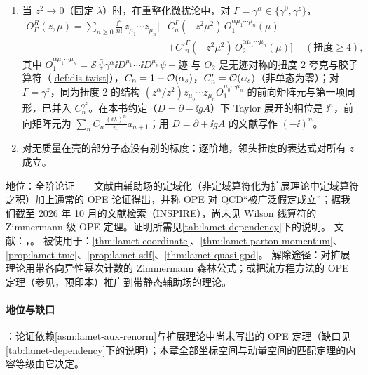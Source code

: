\begin{assumption}\label{asm:lamet-ope}
\begin{enumerate}[label=(OP\arabic*),leftmargin=3.2em,itemsep=1pt,topsep=2pt]
\item 当 $z^2\to0$（固定 $\lambda$）时，在重整化微扰论中，对 $\Gamma=\gamma^\alpha\in\{\gamma^0,\gamma^z\}$，
\begin{equation}\label{eq:lamet-ope}
\begin{split}
O^R_{\Gamma}(z,\mu)=\sum_{n\ge0}\frac{\ii^n}{n!}\,z_{\mu_1}\cdots z_{\mu_n}\Big[&C^\Gamma_n(-z^2\mu^2)\,O_1^{\alpha\mu_1\cdots\mu_n}(\mu)\\
&+C'^\Gamma_n(-z^2\mu^2)\,O_2^{\alpha\mu_1\cdots\mu_n}(\mu)\Big]+(\text{扭度}\ge4),
\end{split}
\end{equation}
其中 $O_1^{\alpha\mu_1\cdots\mu_n}=\mathcal S\,\bar\psi\gamma^\alpha\ii D^{\mu_1}\cdots\ii D^{\mu_n}\psi-\text{迹}$ 与 $O_2$ 是无迹对称的扭度 2 夸克与胶子算符（\cref{def:dis-twist}），$C_n=1+\mathcal{O}\!\left(\alpha_s\right)$，$C'_n=\mathcal{O}\!\left(\alpha_s\right)$（非单态为零）；对 $\Gamma=\gamma^z$，同为扭度 2 的结构 $(z^\alpha/z^2)z_{\mu_0}\cdots z_{\mu_n}O_1^{\mu_0\cdots\mu_n}$ 的前向矩阵元与第一项同形，已并入 $C^{\gamma^z}_n$。在本书约定（$D=\partial-\ii gA$）下 Taylor 展开的相位是 $\ii^n$，前向矩阵元为 $\sum_nC_n\frac{(\ii\lambda)^n}{n!}a_{n+1}$；用 $D=\partial+\ii gA$ 的文献写作 $(-\ii)^n$。
\item 对无质量在壳的部分子态没有别的标度：逐阶地，领头扭度的表达式对所有 $z$ 成立。
\end{enumerate}
地位：全阶论证——文献\cite[第~II~节]{IzubuchiEtAl2018}由辅助场的定域化（非定域算符化为扩展理论中定域算符之积）加上通常的 OPE 论证得出，并称 OPE 对 QCD“被广泛假定成立”；据我们截至 2026 年 10 月的文献检索（INSPIRE），尚未见 Wilson 线算符的 Zimmermann 级 OPE 定理。证明所需见\cref{tab:lamet-dependency}下的说明。
文献：\cite[第~II~节]{IzubuchiEtAl2018}，\cite{Radyushkin2017,Braun:2007wv,Ji:2017oey}。
被使用于：\cref{thm:lamet-coordinate}、\cref{thm:lamet-parton-momentum}、\cref{prop:lamet-tmc}、\cref{prop:lamet-sdf}、\cref{thm:lamet-quasi-gpd}。
解除途径：对扩展理论用带各向异性幂次计数的 Zimmermann 森林公式；或把流方程方法的 OPE 定理（参见\cite{Frob:2016mzv}，预印本）推广到带静态辅助场的理论。
\end{assumption}

\paragraph{地位与缺口}
\tagA：论证依赖\cref{asm:lamet-aux-renorm}与扩展理论中尚未写出的 OPE 定理（缺口见\cref{tab:lamet-dependency}下的说明）；本章全部坐标空间与动量空间的匹配定理的内容等级由它决定。

